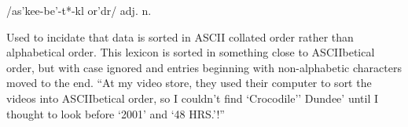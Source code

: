  /as'kee-be'-t*-kl or'dr/ adj. n.

Used to incidate that data is sorted in ASCII collated order rather than alphabetical order. This lexicon is sorted in something close to
ASCIIbetical order, but with case ignored and entries beginning with non-alphabetic characters moved to the end. ``At my video store, they
used their computer to sort the videos into ASCIIbetical order, so I couldn't find `Crocodile'' Dundee' until I thought to look before
`2001' and `48 HRS.'!''

